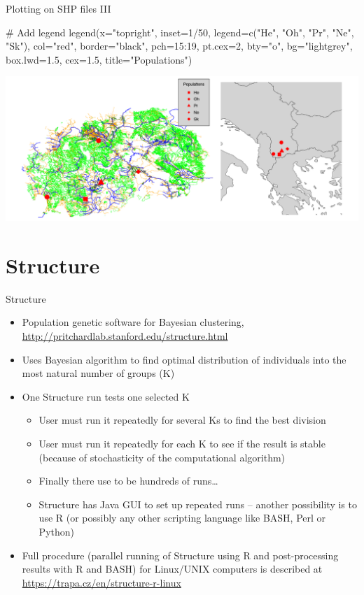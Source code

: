 \documentclass[compress, ucs, xelatex, 11pt, xcolor=svgnames,
  hyperref={
    bookmarks=true,
    unicode=true,
    colorlinks=true,
    pdftitle={Molecular data in R},
    plainpages=false,
    pdfauthor={Vojtech Zeisek},
    pdfsubject={Course about phylogeny and evolution in R},
    pdfcreator={XeLaTeX},
    pdfkeywords={R, evolution, phylogeny, molecular data},
    linkcolor=Tomato,
    anchorcolor=SaddleBrown,
    citecolor=Goldenrod,
    filecolor=DarkMagenta,
    menucolor=Sienna,
    urlcolor=DarkTurquoise,
    pdftex},
  url={hyphens, lowtilde} %
  ]{beamer}
\begin{document}
\begin{frame}[fragile]{Plotting on SHP files III}
  \vfil
  \begin{spluscode}
    # Add legend
    legend(x="topright", inset=1/50, legend=c("He", "Oh", "Pr", "Ne",
      "Sk"), col="red", border="black", pch=15:19, pt.cex=2, bty="o",
      bg="lightgrey", box.lwd=1.5, cex=1.5, title="Populations")
  \end{spluscode}
  \vfill
  \includegraphics[width=\textwidth]{mapy.png}
  \vfil
\end{frame}

\section{Structure}

\begin{frame}{Structure}
  \begin{itemize}
    \item Population genetic software for Bayesian clustering, \url{http://pritchardlab.stanford.edu/structure.html}
    \item Uses Bayesian algorithm to find optimal distribution of individuals into the most natural number of groups (K)
    \item One Structure run tests one selected K
    \begin{itemize}
      \item User must run it repeatedly for several Ks to find the best division
      \item User must run it repeatedly for each K to see if the result is stable (because of stochasticity of the computational algorithm)
      \item Finally there use to be hundreds of runs\ldots
      \item Structure has Java GUI to set up repeated runs -- another possibility is to use R (or possibly any other scripting language like BASH, Perl or Python)
    \end{itemize}
    \item Full procedure (parallel running of Structure using R and post-processing results with R and BASH) for Linux/UNIX computers is described at \url{https://trapa.cz/en/structure-r-linux}
  \end{itemize}
\end{frame}
\end{document}
